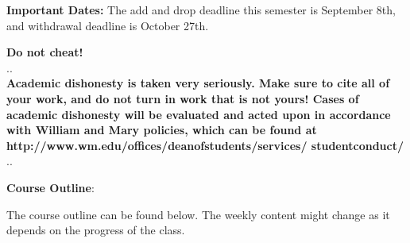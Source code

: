 \documentclass[11pt]{article}
\begin{document}
\textbf {\large Important Dates:} The add and drop deadline this semester is September 8th, and withdrawal deadline is October 27th.

\vspace{4mm}
\textbf {\LARGE Do not cheat!} \\
.\hrulefill . \\
\textbf{Academic dishonesty is taken very seriously.  Make sure to cite all of your work, and do not turn in work that is not yours!  Cases of academic dishonesty will be evaluated and acted upon in accordance with William and Mary policies, which can be found at http://www.wm.edu/offices/deanofstudents/services/
studentconduct/} \\
.\hrulefill . \\
\vspace{8mm}

\textbf {\large Course Outline}:

The course outline can be found below.  The weekly content might change as it depends on the progress of the class.
\end{document}
